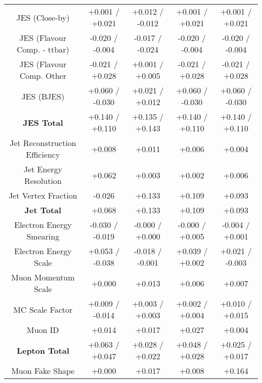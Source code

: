 \begin{table}[htbp]
\begin{center}
\begin{tabular}{|c|c|c|c|c|}
JES (Close-by)                        &+0.001   / +0.021   & +0.012   / -0.012   & +0.001   / +0.021   & +0.001   / +0.021  \\
JES (Flavour Comp. - ttbar)           &-0.020   / -0.004   & -0.017   / -0.024   & -0.020   / -0.004   & -0.020   / -0.004  \\
JES (Flavour Comp. Other              &-0.021   / +0.028   & +0.001   / +0.005   & -0.021   / +0.028   & -0.021   / +0.028  \\
JES (BJES)                            &+0.060   / -0.030   & +0.021   / +0.012   & +0.060   / -0.030   & +0.060   / -0.030  \\
\hline
\textbf{JES Total}                    &+0.140   / +0.110   & +0.135   / +0.143   & +0.140   / +0.110   & +0.140   / +0.110  \\
\hline
Jet Reconstruction Efficiency         &+0.008              & +0.011              & +0.006              & +0.004             \\
Jet Energy Resolution                 &+0.062              & +0.003              & +0.002              & +0.006             \\
Jet Vertex Fraction                   &-0.026              & +0.133              & +0.109              & +0.093             \\
\hline
\textbf{Jet Total}                    &+0.068              & +0.133              & +0.109              & +0.093             \\
\hline
Electron Energy Smearing              &-0.030   / -0.019   & -0.000   / +0.000   & -0.000   / +0.005   & -0.004   / +0.001  \\
Electron Energy Scale                 &+0.053   / -0.038   & -0.018   / -0.001   & +0.039   / +0.002   & +0.021   / -0.003  \\
Muon Momentum Scale                   &+0.000              & +0.013              & +0.006              & +0.007             \\
MC Scale Factor                       &+0.009   / -0.014   & +0.003   / +0.003   & +0.002   / +0.004   & +0.010   / +0.015  \\
Muon ID                               &+0.014              & +0.017              & +0.027              & +0.004             \\
\hline
\textbf{Lepton Total}                 &+0.063   / +0.047   & +0.028   / +0.022   & +0.048   / +0.028   & +0.025   / +0.017  \\
\hline
Muon Fake Shape                       &+0.000              & +0.017              & +0.008              & +0.164             \\

\end{tabular}
\end{center}
\end{table}
